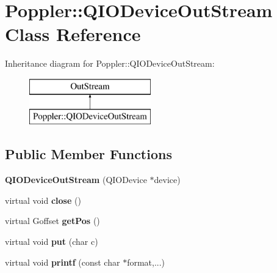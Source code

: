 \hypertarget{class_poppler_1_1_q_i_o_device_out_stream}{}\section{Poppler\+:\+:Q\+I\+O\+Device\+Out\+Stream Class Reference}
\label{class_poppler_1_1_q_i_o_device_out_stream}
Inheritance diagram for Poppler\+:\+:Q\+I\+O\+Device\+Out\+Stream\+:\begin{figure}[H]
\begin{center}
\leavevmode
\includegraphics[height=2.000000cm]{class_poppler_1_1_q_i_o_device_out_stream}
\end{center}
\end{figure}
\subsection*{Public Member Functions}
\begin{DoxyCompactItemize}
\item 
\mbox{\label{class_poppler_1_1_q_i_o_device_out_stream_a68c284872e45634a5b32a1ab6812cfb4}} 
{\bfseries Q\+I\+O\+Device\+Out\+Stream} (Q\+I\+O\+Device $\ast$device)
\item 
\mbox{\label{class_poppler_1_1_q_i_o_device_out_stream_a24752835a0b4f08e3fd99f16970c29f5}} 
virtual void {\bfseries close} ()
\item 
\mbox{\label{class_poppler_1_1_q_i_o_device_out_stream_a7c9d174e103720fc2e777676f11b15bf}} 
virtual Goffset {\bfseries get\+Pos} ()
\item 
\mbox{\label{class_poppler_1_1_q_i_o_device_out_stream_a2a73430d483bbd74d0a7b6472d8982b0}} 
virtual void {\bfseries put} (char c)
\item 
\mbox{\label{class_poppler_1_1_q_i_o_device_out_stream_a6ca08b04f04689fec4e628e547a6a24d}} 
virtual void {\bfseries printf} (const char $\ast$format,...)
\end{DoxyCompactItemize}


